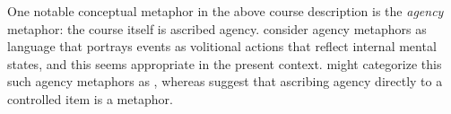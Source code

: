 \noindent One notable conceptual metaphor in the above course
description is the \emph{agency} metaphor: the course itself is
ascribed agency.   consider agency metaphors as
language that portrays events as volitional actions that reflect
internal mental states, and this seems appropriate in the present
context.   might categorize this such agency
metaphors as , whereas
 suggest that ascribing agency directly to a
controlled item is a  metaphor.




